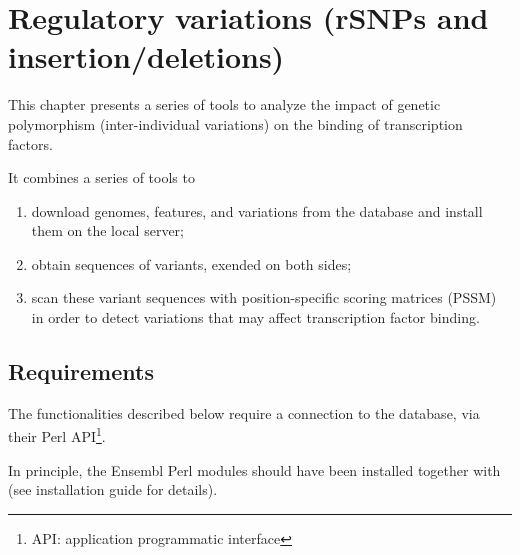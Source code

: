 

\chapter{Regulatory variations (rSNPs and insertion/deletions)}



This chapter presents a series of tools to analyze the impact of
genetic polymorphism (inter-individual variations) on the binding of
transcription factors.

It combines a series of tools to 
\begin{enumerate}
\item download genomes, features, and variations from the \ensembl
  database and install them on the local \RSAT server;
\item obtain sequences of variants, exended on both sides;
\item scan these variant sequences with position-specific scoring
  matrices (PSSM) in order to detect variations that may affect
  transcription factor binding.
\end{enumerate}

\section{Requirements}

The functionalities described below require a connection to the
\ensembl database, via their Perl API\footnote{API: application
  programmatic interface}. 

In principle, the Ensembl Perl modules should have been installed
together with \RSAT (see \RSAT installation guide for details).




